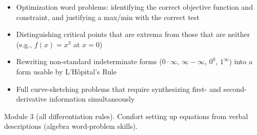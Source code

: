 \documentclass[11pt]{article}
\begin{document}
\begin{diffbox}
\begin{itemize}[nosep]
  \item Optimization word problems: identifying the correct objective function and constraint, and justifying a max/min with the correct test
  \item Distinguishing critical points that are extrema from those that are neither (e.g., $f(x) = x^3$ at $x=0$)
  \item Rewriting non-standard indeterminate forms ($0 \cdot \infty$, $\infty - \infty$, $0^0$, $1^\infty$) into a form usable by L'H\^{o}pital's Rule
  \item Full curve-sketching problems that require synthesizing first- and second-derivative information simultaneously
\end{itemize}
\end{diffbox}

\begin{prereqbox}
Module 3 (all differentiation rules). Comfort setting up equations from verbal
descriptions (algebra word-problem skills).
\end{prereqbox}

\end{document}
